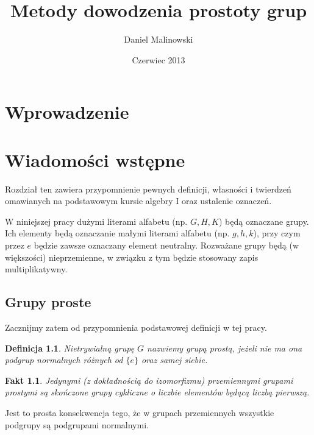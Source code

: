 \documentclass[licencjacka]{pracamgr}
\author{Daniel Malinowski}
\title{Metody dowodzenia prostoty grup}
\date{Czerwiec 2013}
\newtheorem{deff}{Definicja}[section]
\newtheorem{fact}{Fakt}[section]
\begin{document}
\maketitle

\begin{abstract}
\end{abstract}

\tableofcontents


\chapter*{Wprowadzenie}

\chapter{Wiadomości wstępne}

Rozdział ten zawiera przypomnienie pewnych definicji, własności i twierdzeń omawianych na podstawowym kursie algebry I
oraz ustalenie oznaczeń.

W niniejszej pracy dużymi literami alfabetu (np. $G, H, K$) będą oznaczane grupy.
Ich elementy będą oznaczanie małymi literami alfabetu (np. $g, h, k$), przy czym przez $e$ będzie zawsze oznaczany element neutralny.
Rozważane grupy będą (w większości) nieprzemienne, w związku z tym będzie stosowany zapis multiplikatywny.

\section{Grupy proste}

Zacznijmy zatem od przypomnienia podstawowej definicji w tej pracy.
\begin{deff}
	Nietrywialną grupę $G$ nazwiemy \emph{grupą prostą}, jeżeli nie ma ona podgrup normalnych różnych od $\{e\}$ oraz samej siebie.
\end{deff}
\begin{fact}
	Jedynymi (z dokładnością do izomorfizmu) przemiennymi grupami prostymi są skończone grupy cykliczne o liczbie elementów będącą liczbą pierwszą.
\end{fact}
Jest to prosta konsekwencja tego, że w grupach przemiennych wszystkie podgrupy są podgrupami normalnymi.
\end{document}
